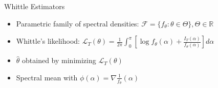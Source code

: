 \begin{frame}{Whittle Estimators}
\begin{itemize}

\item Parametric family of spectral densities: $\mathcal{F}=\{f_\theta: \theta \in \Theta\}, \Theta \in \mathbb{R}$

\item Whittle's likelihood: $\mathcal{L}_T(\theta) = \frac{1}{2\pi}\int_0^\pi \left[ \log f_\theta (\alpha) + \frac{I_T(\alpha)}{f_\theta(\alpha)} \right]d\alpha$

\item $\hat{\theta}$ obtained by minimizing $\mathcal{L}_T(\theta)$

\item Spectral mean with $\phi(\alpha) = \nabla \frac{1}{f_\theta}(\alpha)$

\end{itemize}
\end{frame}
